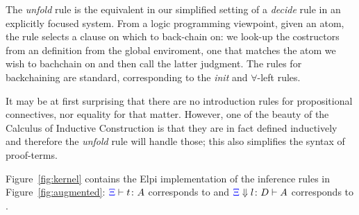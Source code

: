 The \emph{unfold} rule is the equivalent in our simplified setting of
a \emph{decide} rule in an explicitly focused system. From a logic
programming viewpoint, given an atom, the rule selects a clause on which to
back-chain on: we look-up the costructors from an 
definition from the global enviroment, one that matches the atom we wish to bachchain on and then call the latter judgment. The rules for backchaining are standard, corresponding to the \emph{init} and $\forall$-left rules.

It may be at first surprising that there are no
introduction rules for propositional connectives, nor equality for
that matter. However, one of the beauty of the Calculus of Inductive
Construction is that they are in fact defined inductively and
therefore the \emph{unfold} rule will handle those; this also
simplifies the syntax of proof-terms.

%



%
%

Figure~\ref{fig:kernel} contains the Elpi implementation of the
inference rules in Figure~\ref{fig:augmented}: ${\color{blue}{\Xi}}\vdash t \colon A$ corresponds to
 and ${\color{blue}{\Xi}} \Downarrow  l \colon D\vdash A$ corresponds to
.

